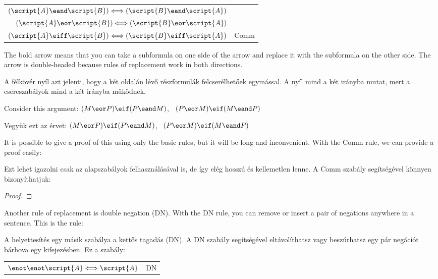 \begin{center}
\begin{tabular}{rl}
$(\script{A}\eand\script{B}) \Longleftrightarrow (\script{B}\eand\script{A})$\\
$(\script{A}\eor\script{B}) \Longleftrightarrow (\script{B}\eor\script{A})$\\
$(\script{A}\eiff\script{B}) \Longleftrightarrow (\script{B}\eiff\script{A})$
& Comm
\end{tabular}
\end{center}

The bold arrow means that you can take a subformula on one side of the arrow and replace it with the subformula on the other side. The arrow is double-headed because rules of replacement work in both directions.

A félkövér nyíl azt jelenti, hogy a két oldalán lévő részformulák felcserélhetőek egymással. A nyíl mind a két irányba mutat, mert a csereszabályok mind a két irányba működnek. 

Consider this argument: $(M \eor P) \eif (P \eand M)$, \therefore\ $(P \eor M) \eif (M \eand P)$

Vegyük ezt az érvet: $(M \eor P) \eif (P \eand M)$, \therefore\ $(P \eor M) \eif (M \eand P)$

It is possible to give a proof of this using only the basic rules, but it will be long and inconvenient. With the Comm rule, we can provide a proof easily:

Ezt lehet igazolni csak az alapszabályok felhasználásával is, de így elég hosszú és kellemetlen lenne. A Comm szabály segítségével könnyen bizonyíthatjuk: 

\begin{proof}
\end{proof}

Another rule of replacement is double negation (DN). With the DN rule, you can remove or insert a pair of negations anywhere in a sentence. This is the rule:

A helyettesítés egy másik szabálya a kettős tagadás (DN). A DN szabály segítségével eltávolíthatsz vagy beszúrhatsz egy pár negációt bárhova egy kifejezésben. Ez a szabály: 

\begin{center}
\begin{tabular}{rl}
$\enot\enot\script{A} \Longleftrightarrow \script{A}$ & DN
\end{tabular}
\end{center}

